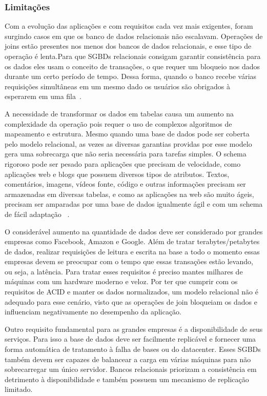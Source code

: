 \subsubsection{Limitações}

Com a evolução das aplicações e com requisitos cada vez mais exigentes, foram surgindo casos em que os banco de dados relacionais não escalavam. Operações de joins estão presentes nos menos dos bancos de dados relacionais, e esse tipo de operação é lenta.Para que SGBDs relacionais consigam garantir consistência para os dados eles usam o conceito de transações, o que requer um bloqueio nos dados durante um certo período de tempo.  Dessa forma, quando o banco recebe várias requisições simultâneas em um mesmo dado os usuários são obrigados à esperarem em uma fila~\cite{cassandraguide}.

A necessidade de transformar os dados em tabelas causa um aumento na complexidade da operação pois requer o uso de complexos algoritmos de mapeamento e estrutura. Mesmo quando uma base de dados pode ser coberta pelo modelo relacional, as vezes as diversas garantias providas por esse modelo gera uma sobrecarga que não seria necessária para tarefas simples. O schema rigoroso pode ser pesado para aplicações que precisam de velocidade, como aplicações web e blogs que possuem diversos tipos de atributos. Textos, comentários, imagens, vídeos fonte, código e outras informações precisam ser armazenadas em diversas tabelas, e como as aplicações na web são muito ágeis, precisam ser amparadas por uma base de dados igualmente ágil e com um schema de fácil adaptação ~\cite{nosqlevaluation}.

O considerável aumento na quantidade de dados deve ser considerado por grandes empresas como Facebook, Amazon e Google. Além de tratar terabytes/petabytes de dados, realizar requisições de leitura e escrita na base a todo o momento essas empresas devem se preocupar com o tempo que essas transações estão levando, ou seja, a latência. Para tratar esses requisitos é preciso mantes milhares de máquinas com um hardware moderno e veloz. Por ter que cumprir com os requisitos de ACID e manter os dados normalizados, um modelo relacional não é adequado para esse cenário, visto que as operações de join bloqueiam os dados e influenciam negativamente no desempenho da aplicação.

Outro requisito fundamental para as grandes empresas é a disponibilidade de seus serviços. Para isso a base de dados deve ser facilmente replicável e fornecer uma forma automática de tratamento à falha de bases ou do datacenter. Esses SGBDs também devem ser capazes de balancear a carga em várias máquinas para não sobrecarregar um único servidor. Bancos relacionais priorizam a consistência em detrimento à disponibilidade e também possuem um mecanismo de replicação limitado.

